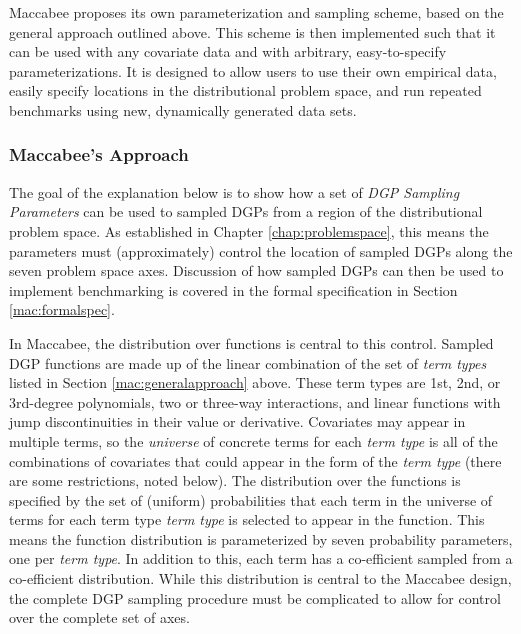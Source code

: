 \documentclass[../main.tex]{subfiles}
\begin{document}
\vspace{\baselineskip}

Maccabee proposes its own parameterization and sampling scheme, based on the general approach outlined above. This scheme is then implemented such that it can be used with any covariate data and with arbitrary, easy-to-specify parameterizations. It is designed to allow users to use their own empirical data, easily specify locations in the distributional problem space, and run repeated benchmarks using new, dynamically generated data sets.

\subsubsection{Maccabee's Approach}

The goal of the explanation below is to show how a set of \textit{DGP Sampling Parameters} can be used to sampled DGPs from a region of the distributional problem space. As established in Chapter \ref{chap:problemspace}, this means the parameters must (approximately) control the location of sampled DGPs along the seven problem space axes. Discussion of how sampled DGPs can then be used to implement benchmarking is covered in the formal specification in Section \ref{mac:formalspec}.

\vspace{\baselineskip}

In Maccabee, the distribution over functions is central to this control. Sampled DGP functions are made up of the linear combination of the set of \textit{term types} listed in Section \ref{mac:generalapproach} above. These term types are 1st, 2nd, or 3rd-degree polynomials, two or three-way interactions, and linear functions with jump discontinuities in their value or derivative. Covariates may appear in multiple terms, so the \textit{universe} of concrete terms for each \textit{term type} is all of the combinations of covariates that could appear in the form of the \textit{term type} (there are some restrictions, noted below). The distribution over the functions is specified by the set of (uniform) probabilities that each term in the universe of terms for each term type \textit{term type} is selected to appear in the function. This means the function distribution is parameterized by seven probability parameters, one per \textit{term type}. In addition to this, each term has a co-efficient sampled from a co-efficient distribution. While this distribution is central to the Maccabee design, the complete DGP sampling procedure must be complicated to allow for control over the complete set of axes.
\end{document}
